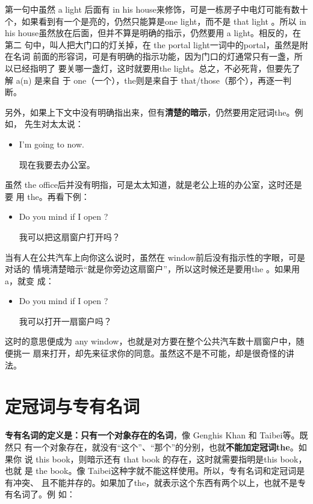 第一句中虽然 a light 后面有 in his house来修饰，可是一栋房子中电灯可能有数十
个，如果看到有一个是亮的，仍然只能算是one light，而不是 that light 。所以 in
his house虽然放在后面，但并不算是明确的指示，仍然要用 a light。相反的，在第二
句中，叫人把大门口的灯关掉，在 the portal light一词中的portal，虽然是附在名词
前面的形容词，可是有明确的指示功能，因为门口的灯通常只有一盏，所以已经指明了
要关哪一盏灯，这时就要用the light。总之，不必死背，但要先了解 a(n) 是来自
于 one（一个），the则是来自于 that/those（那个），再逐一判断。

另外，如果上下文中没有明确指出来，但有\textbf{清楚的暗示}，仍然要用定冠词the。例如，
先生对太太说：

\begin{itemize}
\item  I'm going to  now.

  现在我要去办公室。
\end{itemize}

虽然 the office后并没有明指，可是太太知道，就是老公上班的办公室，这时还是要
用 the。再看下例：

\begin{itemize}
\item  Do you mind if I open ?

  我可以把这扇窗户打开吗？
\end{itemize}

当有人在公共汽车上向你这么说时，虽然在 window前后没有指示性的字眼，可是对话的
情境清楚暗示“就是你旁边这扇窗户”，所以这时候还是要用the 。如果用 a，就变
成：

\begin{itemize}
\item  Do you mind if I open ?

  我可以打开一扇窗户吗？
\end{itemize}

这时的意思便成为 any window，也就是对方要在整个公共汽车数十扇窗户中，随便挑一
扇来打开，却先来征求你的同意。虽然这不是不可能，却是很奇怪的讲法。

\section{定冠词与专有名词}

\textbf{专有名词的定义是：只有一个对象存在的名词}，像 Genghis Khan 和 Taibei等。既然只
有一个对象存在，就没有“这个”、“那个”的分别，也就\textbf{不能加定冠词the}。如果你
说 this book，则暗示还有 that book 的存在，这时就需要指明是this book，也就
是 the book。像 Taibei这种字就不能这样使用。所以，专有名词和定冠词是有冲突、
且不能并存的。如果加了the，就表示这个东西有两个以上，也就不是专有名词了。例
如：

